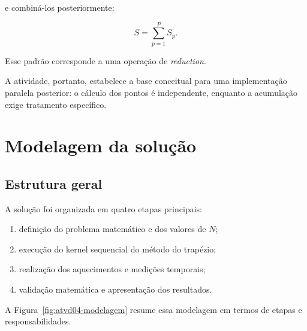 e combiná-los posteriormente:

\begin{equation}
    S =
    \sum_{p=1}^{P}S_p.
\end{equation}

Esse padrão corresponde a uma operação de \emph{reduction}.

A atividade, portanto, estabelece a base conceitual para uma implementação
paralela posterior: o cálculo dos pontos é independente, enquanto a
acumulação exige tratamento específico.


\section{Modelagem da solução}

\label{sec:atvd04-modelagem}

\subsection{Estrutura geral}

A solução foi organizada em quatro etapas principais:

\begin{enumerate}
    \item definição do problema matemático e dos valores de \(N\);
    \item execução do kernel sequencial do método do trapézio;
    \item realização dos aquecimentos e medições temporais;
    \item validação matemática e apresentação dos resultados.
\end{enumerate}

A Figura~\ref{fig:atvd04-modelagem} resume essa modelagem em termos de
etapas e responsabilidades.

